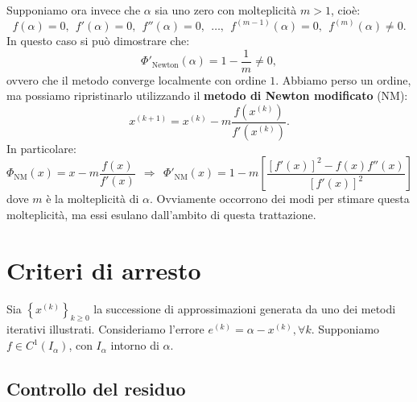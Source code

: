 Supponiamo ora invece che $\alpha $ sia uno zero con molteplicità $m >1$, cioè:
\begin{equation*}
f( \alpha ) =0,\ \ f'( \alpha ) =0,\ \ f''( \alpha ) =0,\ \ \dotsc ,\ \ f^{( m-1)}( \alpha ) =0,\ \ f^{(m)}( \alpha ) \neq 0.
\end{equation*}
In questo caso si può dimostrare che:
\begin{equation*}
\Phi '_{\text{Newton}}( \alpha ) =1-\frac{1}{m} \neq 0,
\end{equation*}
ovvero che il metodo converge localmente con ordine $1$. Abbiamo perso un ordine, ma possiamo ripristinarlo utilizzando il \textbf{metodo di Newton modificato} (NM):
\begin{equation*}
x^{( k+1)} =x^{(k)} -m\frac{f\left( x^{(k)}\right)}{f'\left( x^{(k)}\right)}.
\end{equation*}
In particolare:
\begin{equation*}
\Phi _{\text{NM}}(x) =x-m\frac{f(x)}{f'(x)} \ \ \Rightarrow \ \ \Phi '_{\text{NM}}(x) =1-m\left[\frac{[ f'(x)]^{2} -f(x) f''(x)}{[ f'(x)]^{2}}\right]
\end{equation*}
dove $m$ è la molteplicità di $\alpha$. Ovviamente occorrono dei modi per stimare questa molteplicità, ma essi esulano dall'ambito di questa trattazione.


\section{Criteri di arresto}
Sia $\left\{x^{(k)}\right\}_{k\geqslant 0}$ la successione di approssimazioni generata da uno dei metodi iterativi illustrati.
Consideriamo l'errore $e^{(k)} =\alpha -x^{(k)} ,\forall k$.
Supponiamo $f\in C^{1}( I_{\alpha })$, con $I_{\alpha }$ intorno di $\alpha $.
\subsection{Controllo del residuo}

